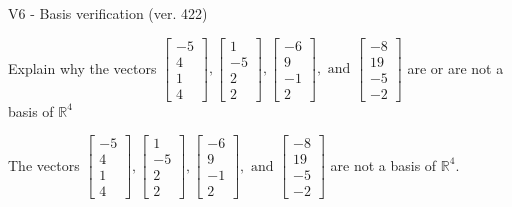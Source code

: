 \begin{exercise}
  \begin{exerciseTitle}V6 - Basis verification (ver. 422)\end{exerciseTitle}
  \begin{exerciseStatement}
    Explain why the vectors \(\left[\begin{array}{r}
-5 \\
4 \\
1 \\
4
\end{array}\right] , \left[\begin{array}{r}
1 \\
-5 \\
2 \\
2
\end{array}\right] , \left[\begin{array}{r}
-6 \\
9 \\
-1 \\
2
\end{array}\right] , \text{ and } \left[\begin{array}{r}
-8 \\
19 \\
-5 \\
-2
\end{array}\right]\) are or are not a basis of \(\mathbb{R}^4\)	


  \end{exerciseStatement}
  \begin{exerciseAnswer}
   The vectors \(\left[\begin{array}{r}
-5 \\
4 \\
1 \\
4
\end{array}\right] , \left[\begin{array}{r}
1 \\
-5 \\
2 \\
2
\end{array}\right] , \left[\begin{array}{r}
-6 \\
9 \\
-1 \\
2
\end{array}\right] , \text{ and } \left[\begin{array}{r}
-8 \\
19 \\
-5 \\
-2
\end{array}\right]\) 
  	 are not  a basis of \(\mathbb{R}^4\).
  


  \end{exerciseAnswer}
\end{exercise}